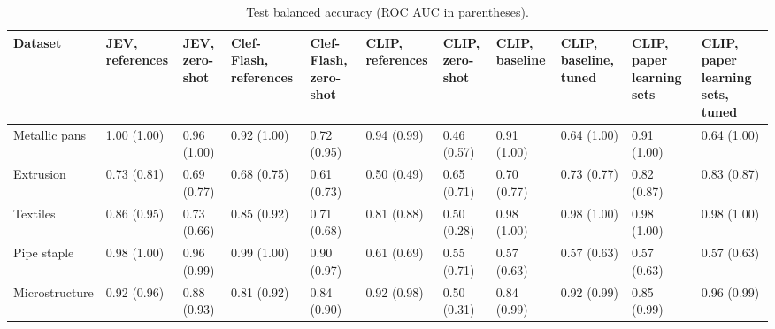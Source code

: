 \begin{table}

\caption{\label{tab:tbl-test-results}Test balanced accuracy (ROC AUC in parentheses).}
\centering
\begin{tabular}[t]{lllllllllll}
\toprule
Dataset & JEV, references & JEV, zero-shot & Clef-Flash, references & Clef-Flash, zero-shot & CLIP, references & CLIP, zero-shot & CLIP, baseline & CLIP, baseline, tuned & CLIP, paper learning sets & CLIP, paper learning sets, tuned\\
\midrule
Metallic pans & 1.00 (1.00) & 0.96 (1.00) & 0.92 (1.00) & 0.72 (0.95) & 0.94 (0.99) & 0.46 (0.57) & 0.91 (1.00) & 0.64 (1.00) & 0.91 (1.00) & 0.64 (1.00)\\
Extrusion & 0.73 (0.81) & 0.69 (0.77) & 0.68 (0.75) & 0.61 (0.73) & 0.50 (0.49) & 0.65 (0.71) & 0.70 (0.77) & 0.73 (0.77) & 0.82 (0.87) & 0.83 (0.87)\\
Textiles & 0.86 (0.95) & 0.73 (0.66) & 0.85 (0.92) & 0.71 (0.68) & 0.81 (0.88) & 0.50 (0.28) & 0.98 (1.00) & 0.98 (1.00) & 0.98 (1.00) & 0.98 (1.00)\\
Pipe staple & 0.98 (1.00) & 0.96 (0.99) & 0.99 (1.00) & 0.90 (0.97) & 0.61 (0.69) & 0.55 (0.71) & 0.57 (0.63) & 0.57 (0.63) & 0.57 (0.63) & 0.57 (0.63)\\
Microstructure & 0.92 (0.96) & 0.88 (0.93) & 0.81 (0.92) & 0.84 (0.90) & 0.92 (0.98) & 0.50 (0.31) & 0.84 (0.99) & 0.92 (0.99) & 0.85 (0.99) & 0.96 (0.99)\\
\bottomrule
\end{tabular}
\end{table}
